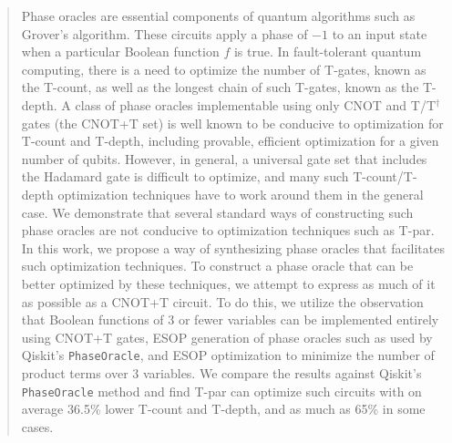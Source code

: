 \documentclass[conference]{IEEEtran}
\begin{document}
\begin{abstract}
  Phase oracles are essential components of quantum algorithms such as Grover's algorithm. These circuits apply a phase of $-1$ to an input state when a particular Boolean function $f$ is true. In fault-tolerant quantum computing, there is a need to optimize the number of T-gates, known as the T-count, as well as the longest chain of such T-gates, known as the T-depth. A class of phase oracles implementable using only CNOT and T/T$^{\dagger}$ gates (the CNOT+T set) is well known to be conducive to optimization for T-count and T-depth, including provable, efficient optimization for a given number of qubits. However, in general, a universal gate set that includes the Hadamard gate is difficult to optimize, and many such T-count/T-depth optimization techniques have to work around them in the general case. We demonstrate that several standard ways of constructing such phase oracles are not conducive to optimization techniques such as T-par. In this work, we propose a way of synthesizing phase oracles that facilitates such optimization techniques. To construct a phase oracle that can be better optimized by these techniques, we attempt to express as much of it as possible as a CNOT+T circuit. To do this, we utilize the observation that Boolean functions of 3 or fewer variables can be implemented entirely using CNOT+T gates, ESOP generation of phase oracles such as used by Qiskit's \texttt{PhaseOracle}, and ESOP optimization to minimize the number of product terms over 3 variables. We compare the results against Qiskit's \texttt{PhaseOracle} method and find T-par can optimize such circuits with on average 36.5\% lower T-count and T-depth, and as much as 65\% in some cases.


\end{abstract}













\renewcommand{\baselinestretch}{1.10}


\end{document}
